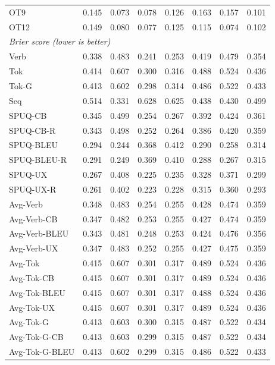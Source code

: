 {\begin{longtable}{@{}lrrrrrrr@{}}
OT9 & 0.145 & 0.073 & 0.078 & 0.126 & 0.163 & 0.157 & 0.101 \\
OT12 & 0.149 & 0.080 & 0.077 & 0.125 & 0.115 & 0.074 & 0.102 \\
\midrule
\multicolumn{8}{l}{\textit{Brier score (lower is better)}} \\
\midrule
Verb & 0.338 & 0.483 & 0.241 & 0.253 & 0.419 & 0.479 & 0.354 \\
\addlinespace
Tok & 0.414 & 0.607 & 0.300 & 0.316 & 0.488 & 0.524 & 0.436 \\
Tok-G & 0.413 & 0.602 & 0.298 & 0.314 & 0.486 & 0.522 & 0.433 \\
\addlinespace
Seq & 0.514 & 0.331 & 0.628 & 0.625 & 0.438 & 0.430 & 0.499 \\
\addlinespace
SPUQ-CB & 0.345 & 0.499 & 0.254 & 0.267 & 0.392 & 0.424 & 0.361 \\
SPUQ-CB-R & 0.343 & 0.498 & 0.252 & 0.264 & 0.386 & 0.420 & 0.359 \\
SPUQ-BLEU & 0.294 & 0.244 & 0.368 & 0.412 & 0.290 & 0.258 & 0.314 \\
SPUQ-BLEU-R & 0.291 & 0.249 & 0.369 & 0.410 & 0.288 & 0.267 & 0.315 \\
SPUQ-UX & 0.267 & 0.408 & 0.225 & 0.235 & 0.328 & 0.371 & 0.299 \\
SPUQ-UX-R & 0.261 & 0.402 & 0.223 & 0.228 & 0.315 & 0.360 & 0.293 \\
\addlinespace
Avg-Verb & 0.348 & 0.483 & 0.254 & 0.255 & 0.428 & 0.474 & 0.359 \\
Avg-Verb-CB & 0.347 & 0.482 & 0.253 & 0.255 & 0.427 & 0.474 & 0.359 \\
Avg-Verb-BLEU & 0.343 & 0.481 & 0.248 & 0.253 & 0.424 & 0.476 & 0.356 \\
Avg-Verb-UX & 0.347 & 0.483 & 0.252 & 0.255 & 0.427 & 0.475 & 0.359 \\
\addlinespace
Avg-Tok & 0.415 & 0.607 & 0.301 & 0.317 & 0.489 & 0.524 & 0.436 \\
Avg-Tok-CB & 0.415 & 0.607 & 0.301 & 0.317 & 0.489 & 0.524 & 0.436 \\
Avg-Tok-BLEU & 0.415 & 0.607 & 0.301 & 0.317 & 0.488 & 0.524 & 0.436 \\
Avg-Tok-UX & 0.415 & 0.607 & 0.301 & 0.317 & 0.489 & 0.524 & 0.436 \\
Avg-Tok-G & 0.413 & 0.603 & 0.300 & 0.315 & 0.487 & 0.522 & 0.434 \\
Avg-Tok-G-CB & 0.413 & 0.603 & 0.299 & 0.315 & 0.487 & 0.522 & 0.434 \\
Avg-Tok-G-BLEU & 0.413 & 0.602 & 0.299 & 0.315 & 0.486 & 0.522 & 0.433 \\

\end{longtable}}
